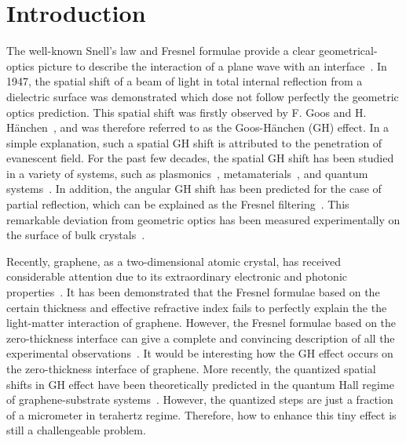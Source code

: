 \documentclass[twocolumn,showpacs,preprintnumbers,amsmath,amssymb]{revtex4}
\begin{document}
\section{Introduction}\label{SecI}
The well-known Snell's law and Fresnel formulae provide a clear geometrical-optics
picture to describe the interaction of a plane wave with an interface~\cite{Jackson1999,Born2005}.
In 1947, the spatial shift of a beam of light in total internal reflection
from a dielectric surface was demonstrated which dose not follow perfectly the geometric optics prediction.
This spatial shift was firstly observed by F. Goos
and H. H\"{a}nchen~\cite{Goos1946}, and was therefore referred to as the Goos-H\"{a}nchen (GH) effect.
In a simple explanation, such a spatial GH shift is attributed to the penetration of evanescent field.
For the past few decades, the spatial GH shift has been studied in a variety
of systems, such as plasmonics~\cite{Yin2004,Yin2006,Salasnich2012}, metamaterials~\cite{Wild1982,Pfleghaar1993,Emile1995,Bonnet2001,Berman2002,Felbacq2003,Shadrivov2003,Felbacq2004,He2006,Longhi2011,Grosche2016,Xu2016},
and quantum systems~\cite{Beenakker2009,Lee2014}.
In addition, the angular GH shift has been predicted
for the case of partial reflection, which can be explained as the Fresnel filtering~\cite{Tureci2002,Schomerus2006}. This
remarkable deviation from geometric optics has been
measured experimentally on the surface of bulk crystals~\cite{Merano2009,Merano2010,Araujo2016,Araujo2017}.

Recently, graphene, as a two-dimensional atomic crystal,
has received considerable attention due to its
extraordinary electronic and photonic properties~\cite{Novoselov2004,Neto2009,Bonaccorso2010}.
It has been demonstrated that the Fresnel formulae
based on the certain thickness and effective refractive index
fails to perfectly explain the the light-matter
interaction of graphene. However, the Fresnel formulae based on the
zero-thickness interface can give a complete and convincing
description of all the experimental observations~\cite{Merano2016II,Chen2017}.
It would be interesting how the GH effect occurs on the zero-thickness interface of graphene.
More recently, the quantized spatial shifts in GH effect
have been theoretically predicted in the quantum Hall regime of graphene-substrate systems~\cite{Kamp2016}.
However, the quantized steps are just a fraction of a micrometer in terahertz regime.
Therefore, how to enhance this tiny effect is still a challengeable problem.
\end{document}
